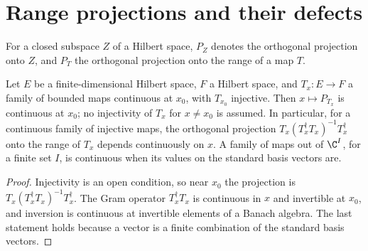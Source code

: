 \section{Range projections and their defects}
\label{sec:perturbations_projections}

For a closed subspace $Z$ of a Hilbert space, $P_Z$ denotes the orthogonal
projection onto $Z$, and $P_T$ the orthogonal projection onto the range of a
map $T$.

\begin{lemma}
    \label{thm:continuous_injective_range_projector}
    \leanok
    Let $E$ be a finite-dimensional Hilbert space, $F$ a Hilbert space, and
    $T_x\colon E\to F$ a family of bounded maps continuous at $x_0$, with
    $T_{x_0}$ injective. Then $x\mapsto P_{T_x}$ is continuous at $x_0$; no
    injectivity of $T_x$ for $x\neq x_0$ is assumed. In particular, for a
    continuous family of injective maps, the orthogonal projection
    $T_x(T_x^\dagger T_x)^{-1}T_x^\dagger$ onto the range of $T_x$ depends
    continuously on $x$. A family of maps out of $\C^I$, for a finite set $I$,
    is continuous when its values on the standard basis vectors are.
\end{lemma}
\begin{proof}
    \leanok
    Injectivity is an open condition, so near $x_0$ the projection is
    $T_x(T_x^\dagger T_x)^{-1}T_x^\dagger$. The Gram operator
    $T_x^\dagger T_x$ is continuous in $x$ and invertible at $x_0$, and
    inversion is continuous at invertible elements of a Banach algebra. The
    last statement holds because a vector is a finite combination of the
    standard basis vectors.
\end{proof}

